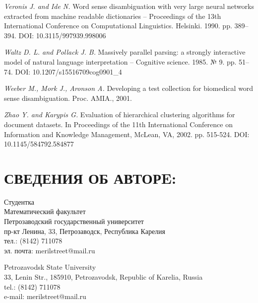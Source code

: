 \documentclass{article}
\begin{document}
\begin{articletext}
\begin{thebibliography}{9}
\textit{Veronis J. and Ide N. }Word  sense  disambiguation  with  very  large neural  networks  extracted  from machine readable dictionaries – Proceedings of the 13th International Conference on Computational Linguistics. Helsinki. 1990. pp. 389–394. DOI: 10.3115/997939.998006

\textit{Waltz D. L. and  Pollack J. B. }Massively parallel parsing: a strongly interactive  model  of  natural  language interpretation – Cognitive science. 1985. № 9. pp. 51–74. DOI: 10.1207/s15516709cog0901\_4
                     
\textit{Weeber M.,  Mork J.,  Aronson A. }Developing a test collection for biomedical word sense disambiguation. Proc. AMIA., 2001.

\textit{Zhao Y. and  Karypis G. }Evaluation of hierarchical clustering algorithms for document datasets. In Proceedings of the 11th International Conference on Information and Knowledge Management, McLean, VA, 2002. pp. 515-524. DOI: 10.1145/584792.584877



\end{thebibliography}
\end{articletext}


\section{СВЕДЕНИЯ ОБ АВТОРE:}

\begin{aboutauthors}
Студентка\\
Математический факультет\\ 
Петрозаводский государственный университет\\
пр-кт Ленина, 33, Петрозаводск, Республика Карелия\\
тел.: (8142) 711078\\
эл. почта: merilstreet@mail.ru

\columnbreak

Petrozavodsk State University\\
33, Lenin Str., 185910, Petrozavodsk, Republic of Karelia, Russia\\
tel.: (8142) 711078\\
e-mail: merilstreet@mail.ru
\end{aboutauthors}
\end{document}
